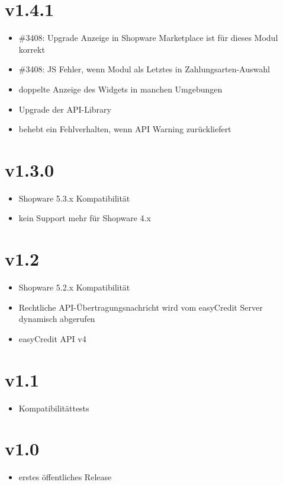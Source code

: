 \documentclass[a4paper,10pt,openany,oneside,ngerman]{sphinxmanual}
\begin{document}
\section{v1.4.1}
\label{\detokenize{changelog:v1-4-1}}\begin{itemize}
\item {} 
\#3408: Upgrade Anzeige in Shopware Marketplace ist für dieses Modul korrekt

\item {} 
\#3408: JS Fehler, wenn Modul als Letztes in Zahlungsarten-Auswahl

\item {} 
doppelte Anzeige des Widgets in manchen Umgebungen

\item {} 
Upgrade der API-Library

\item {} 
behebt ein Fehlverhalten, wenn API Warning zurückliefert

\end{itemize}


\section{v1.3.0}
\label{\detokenize{changelog:v1-3-0}}\begin{itemize}
\item {} 
Shopware 5.3.x Kompatibilität

\item {} 
kein Support mehr für Shopware 4.x

\end{itemize}


\section{v1.2}
\label{\detokenize{changelog:v1-2}}\begin{itemize}
\item {} 
Shopware 5.2.x Kompatibilität

\item {} 
Rechtliche API-Übertragungsnachricht wird vom easyCredit Server dynamisch abgerufen

\item {} 
easyCredit API v4

\end{itemize}


\section{v1.1}
\label{\detokenize{changelog:v1-1}}\begin{itemize}
\item {} 
Kompatibilitättests

\end{itemize}


\section{v1.0}
\label{\detokenize{changelog:v1-0}}\begin{itemize}
\item {} 
erstes öffentliches Release

\end{itemize}



\renewcommand{\indexname}{Stichwortverzeichnis}
\footnotesize\raggedright\printindex
\end{document}
